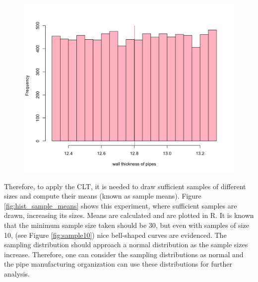 \documentclass[10pt,leter,openany]{article}
\begin{document}
		\begin{figure}
			\begin{center}
				\includegraphics[scale=0.15]{img/hist_data}
				\label{fig:hist_data}
			\end{center}
		\end{figure}
		
		Therefore, to apply the CLT, it is needed to draw sufficient samples of different sizes and compute their means (known as sample means). Figure \ref{fig:hist_sample_means} shows this experiment, where sufficient samples are drawn, increasing its sizes. Means are calculated and are plotted in R. It is known that the minimum sample size taken should be 30, but even with samples of size 10, (see Figure \ref{fig:sample10}) nice bell-shaped curves are evidenced. The sampling distribution should approach a normal distribution as the sample sizes increase. Therefore, one can consider the sampling distributions as normal and the pipe manufacturing organization can use these distributions for further analysis.
		
\end{document}
